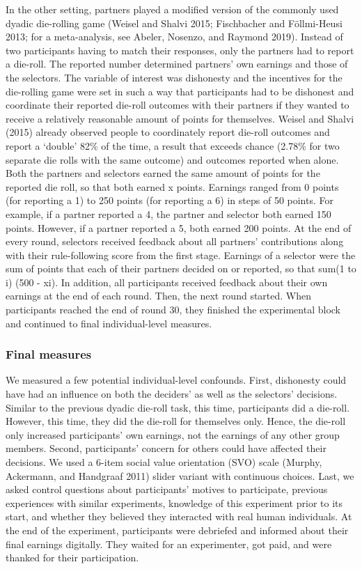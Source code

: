 \documentclass[man]{apa6}
\begin{document}
In the other setting, partners played a modified version of the commonly
used dyadic die-rolling game (Weisel and Shalvi 2015; Fischbacher and
Föllmi-Heusi 2013; for a meta-analysis, see Abeler, Nosenzo, and Raymond
2019). Instead of two participants having to match their responses, only
the partners had to report a die-roll. The reported number determined
partners' own earnings and those of the selectors. The variable of
interest was dishonesty and the incentives for the die-rolling game were
set in such a way that participants had to be dishonest and coordinate
their reported die-roll outcomes with their partners if they wanted to
receive a relatively reasonable amount of points for themselves. Weisel
and Shalvi (2015) already observed people to coordinately report
die-roll outcomes and report a `double' 82\% of the time, a result that
exceeds chance (2.78\% for two separate die rolls with the same outcome)
and outcomes reported when alone. Both the partners and selectors earned
the same amount of points for the reported die roll, so that both earned
x points. Earnings ranged from 0 points (for reporting a 1) to 250
points (for reporting a 6) in steps of 50 points. For example, if a
partner reported a 4, the partner and selector both earned 150 points.
However, if a partner reported a 5, both earned 200 points. At the end
of every round, selectors received feedback about all partners'
contributions along with their rule-following score from the first
stage. Earnings of a selector were the sum of points that each of their
partners decided on or reported, so that sum(1 to i) (500 - xi). In
addition, all participants received feedback about their own earnings at
the end of each round. Then, the next round started. When participants
reached the end of round 30, they finished the experimental block and
continued to final individual-level measures.

\hypertarget{final-measures}{%
\subsubsection{Final measures}\label{final-measures}}

We measured a few potential individual-level confounds. First,
dishonesty could have had an influence on both the deciders' as well as
the selectors' decisions. Similar to the previous dyadic die-roll task,
this time, participants did a die-roll. However, this time, they did the
die-roll for themselves only. Hence, the die-roll only increased
participants' own earnings, not the earnings of any other group members.
Second, participants' concern for others could have affected their
decisions. We used a 6-item social value orientation (SVO) scale
(Murphy, Ackermann, and Handgraaf 2011) slider variant with continuous
choices. Last, we asked control questions about participants' motives to
participate, previous experiences with similar experiments, knowledge of
this experiment prior to its start, and whether they believed they
interacted with real human individuals. At the end of the experiment,
participants were debriefed and informed about their final earnings
digitally. They waited for an experimenter, got paid, and were thanked
for their participation.
\end{document}
